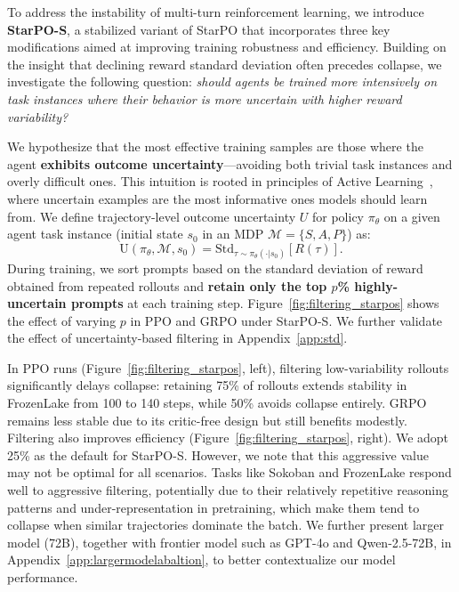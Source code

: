 To address the instability of multi-turn reinforcement learning, we introduce \textbf{StarPO-S}, a stabilized variant of StarPO that incorporates three key modifications aimed at improving training robustness and efficiency. Building on the insight that declining reward standard deviation often precedes collapse, we investigate the following question: \textit{should agents be trained more intensively on task instances where their behavior is more uncertain with higher reward variability?} 

We hypothesize that the most effective training samples are those where the agent \textbf{exhibits outcome uncertainty}—avoiding both trivial task instances and overly difficult ones. This intuition is rooted in principles of Active Learning~\citep{activelearning}, where uncertain examples are the most informative ones models should learn from. We define trajectory-level outcome uncertainty $U$ for policy $\pi_\theta$ on a given agent task instance (initial state $s_0$ in an MDP $\mathcal{M} = \{S, A, P\}$) as:
\begin{equation}
\text{U}(\pi_{\theta}, \mathcal{M}, s_0) = \text{Std}_{\tau \sim \pi_\theta(\cdot | s_0)}\left[R(\tau)\right].
\end{equation}
During training, we sort prompts based on the standard deviation of reward obtained from repeated rollouts and \textbf{retain only the top $p$\% highly-uncertain prompts} at each training step. Figure~\ref{fig:filtering_starpos} shows the effect of varying $p$ in PPO and GRPO under StarPO-S. We further validate the effect of uncertainty-based filtering in Appendix~\ref{app:std}.


In PPO runs (Figure~\ref{fig:filtering_starpos}, left), filtering low-variability rollouts significantly delays collapse: retaining 75\% of rollouts extends stability in FrozenLake from 100 to 140 steps, while 50\% avoids collapse entirely. GRPO remains less stable due to its critic-free design but still benefits modestly. Filtering also improves efficiency (Figure~\ref{fig:filtering_starpos}, right). We adopt 25\% as the default for StarPO-S. However, we note that this aggressive value may not be optimal for all scenarios.
Tasks like Sokoban and FrozenLake respond well to aggressive filtering, potentially due to their relatively repetitive reasoning patterns and under-representation in pretraining, which make them tend to collapse when similar trajectories dominate the batch. We further present larger model (72B), together with frontier model such as GPT-4o and Qwen-2.5-72B, in Appendix~\ref{app:largermodelabaltion}, to better contextualize our model performance.

